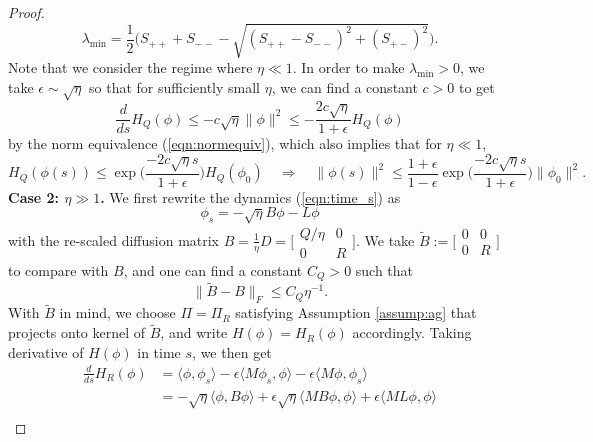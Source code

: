 \documentclass[11pt]{article}
\newcommand{\1}{\mathds{1}}
\begin{document}
\begin{proof}
\begin{equation}
    \lambda_{\min} = \frac{1}{2}\Big(S_{++} + S_{--}-\sqrt{(S_{++}-S_{--})^2+(S_{+-})^2}\Big).
\end{equation}
Note that we consider the regime where $\eta\ll1$. In order to make $\lambda_{\min}>0$,  we take $\epsilon \sim \sqrt{\eta}$ so that for sufficiently small $\eta$, we can find a constant $c>0$ to get
\begin{equation}
     \frac{d}{ds} H_Q(\phi) \leq -c\sqrt{\eta} \|\phi\|^2\leq -\frac{2c\sqrt{\eta}}{1+\epsilon} H_Q(\phi)
\end{equation}
by the norm equivalence (\ref{eqn:normequiv}), which also implies that for $\eta\ll 1$,
\begin{equation}
    H_Q(\phi(s))\leq \exp\Big(\frac{-2c\sqrt{\eta}s}{1+\epsilon}\Big) H_Q(\phi_0) \quad \Longrightarrow \quad \|\phi(s)\|^2 \leq \frac{1+\epsilon}{1-\epsilon}\exp\Big(\frac{-2c\sqrt{\eta}s}{1+\epsilon}\Big) \|\phi_0\|^2.
\end{equation}
\textbf{Case 2: $\eta\gg 1$.}
We first rewrite the dynamics (\ref{eqn:time_s}) as
\begin{equation}
     \phi_s = -\sqrt{\eta }B \phi- L\phi
\end{equation}
with the re-scaled diffusion matrix  
$B= \frac{1}{\eta} D=  \bigl[ \begin{smallmatrix}
            Q/\eta & 0\\
            0 & R
 \end{smallmatrix}\bigr]$. We take 
$\tilde B  := \bigl[\begin{smallmatrix}
            0 & 0\\
            0 & R
        \end{smallmatrix}\bigr]$ to compare with $B$, and one can find a constant $C_Q>0$ such that 
        \begin{equation}
            \|\tilde B- B\|_F\leq C_Q \eta^{-1}.
        \end{equation}
With $\tilde B$ in mind, we choose $\Pi = \Pi_R$ satisfying Assumption \ref{assump:ag} that projects onto kernel of  $\tilde B$, and write $H(\phi) = H_R(\phi)$ accordingly. Taking derivative of $H(\phi)$ in time $s$, we then get
\begin{equation}
    \begin{aligned}
        \frac{d}{ds} H_R(\phi) &= \langle \phi, \phi_s\rangle-\epsilon\langle M\phi_s, \phi\rangle-\epsilon\langle M\phi, \phi_s\rangle\\
        &= -\sqrt{\eta}\langle \phi, B\phi\rangle + \epsilon\sqrt{\eta}\langle M B\phi, \phi\rangle+\epsilon\langle M L\phi, \phi\rangle\\

\end{aligned}
\end{equation}
\end{proof}
\end{document}
